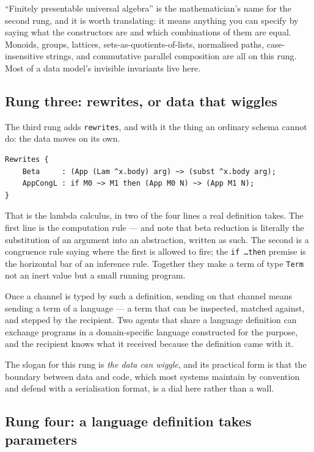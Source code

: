 \begin{aside}
``Finitely presentable universal algebra'' is the mathematician's name for the
second rung, and it is worth translating: it means anything you can specify by
saying what the constructors are and which combinations of them are equal.
Monoids, groups, lattices, sets-as-quotients-of-lists, normalised paths,
case-insensitive strings, and commutative parallel composition are all on this
rung. Most of a data model's invisible invariants live here.
\end{aside}

\subsection{Rung three: rewrites, or data that wiggles}

The third rung adds \texttt{rewrites}, and with it the thing an ordinary schema
cannot do: the data moves on its own.

\begin{lstlisting}[language=mettail]
Rewrites {
    Beta     : (App (Lam ^x.body) arg) ~> (subst ^x.body arg);
    AppCongL : if M0 ~> M1 then (App M0 N) ~> (App M1 N);
}
\end{lstlisting}

That is the lambda calculus, in two of the four lines a real definition takes.
The first line is the computation rule --- and note that beta reduction is
literally the substitution of an argument into an abstraction, written as such.
The second is a congruence rule saying where the first is allowed to fire; the
\texttt{if \dots then} premise is the horizontal bar of an inference rule. Together they make a term of type
\texttt{Term} not an inert value but a small running program.

Once a channel is typed by such a definition, sending on that channel means
sending a term of a language --- a term that can be inspected, matched against,
and stepped by the recipient. Two agents that share a language definition can
exchange programs in a domain-specific language constructed for the purpose, and
the recipient knows what it received because the definition came with it.

The slogan for this rung is \emph{the data can wiggle}, and its practical form
is that the boundary between data and code, which most systems maintain by
convention and defend with a serialisation format, is a dial here rather than a
wall.

\subsection{Rung four: a language definition takes parameters}
\label{sec:reuse}

